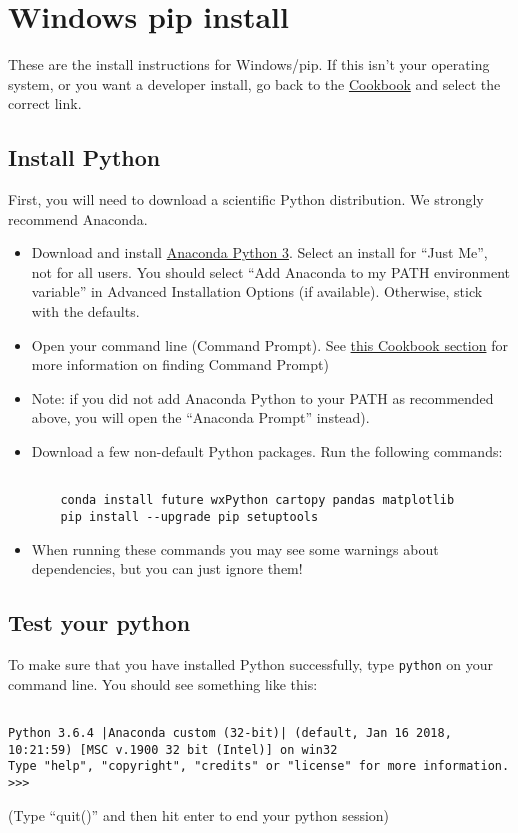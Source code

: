\documentclass[11pt]{article}
\begin{document}
\tableofcontents

\section{Windows pip install}

These are the install instructions for Windows/pip.  If this isn't your operating system, or you want a developer install, go back to the \href{https://earthref.org/PmagPy/cookbook/#next_steps}{Cookbook} and select the correct link.


\subsection{Install Python}
First, you will need to download a scientific Python distribution.  We strongly recommend Anaconda.

   \begin{itemize}
   \item Download and install \href{https://www.anaconda.com/download}{Anaconda Python 3}.  Select an install for “Just Me”, not for all users.  You should select ``Add Anaconda to my PATH environment variable'' in Advanced Installation Options (if available).  Otherwise, stick with the defaults.
   \item Open your command line (Command Prompt).  See \href{https://earthref.org/PmagPy/cookbook/#command_line}{this Cookbook section} for more information on finding Command Prompt)
   \item Note: if you did not add Anaconda Python to your PATH as recommended above, you will open the ``Anaconda Prompt'' instead).
   \item Download a few non-default Python packages.  Run the following commands: \begin{verbatim}

    conda install future wxPython cartopy pandas matplotlib
    pip install --upgrade pip setuptools
\end{verbatim}
   \item When running these commands you may see some warnings about dependencies, but you can just ignore them!

\end{itemize}


\subsection{Test your python}

To make sure that you have installed Python successfully, type \texttt{python} on your command line.  You should see something like this: \begin{verbatim}

Python 3.6.4 |Anaconda custom (32-bit)| (default, Jan 16 2018, 10:21:59) [MSC v.1900 32 bit (Intel)] on win32
Type "help", "copyright", "credits" or "license" for more information.
>>>\end{verbatim}
(Type ``quit()'' and then hit enter to end your python session)
\end{document}
